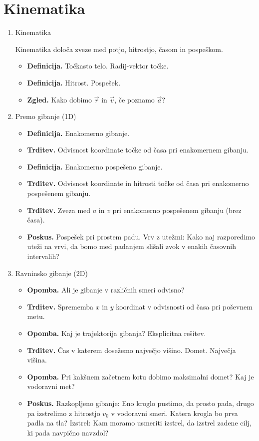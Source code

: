 \section{Kinematika}

\begin{enumerate}
    \item Kinematika
    
    Kinematika določa zveze med potjo, hitrostjo, časom in pospeškom.
    \begin{itemize}
        \item \textbf{Definicija.} Točkasto telo. Radij-vektor točke.
        \item \textbf{Definicija.} Hitrost. Pospešek.
        \item \textbf{Zgled.} Kako dobimo \(\vec{r}\) in \(\vec{v}\), če poznamo \(\vec{a}\)?
    \end{itemize}

    \item Premo gibanje (1D)
    \begin{itemize}
        \item \textbf{Definicija.} Enakomerno gibanje.
        \item \textbf{Trditev.} Odvisnost koordinate točke od časa pri enakomernem gibanju.
        \item \textbf{Definicija.} Enakomerno pospešeno gibanje.
        \item \textbf{Trditev.} Odvisnost koordinate in hitrosti točke od časa pri enakomerno pospešenem gibanju.
        \item \textbf{Trditev.} Zveza med \(a\) in \(v\) pri enakomerno pospešenem gibanju (brez časa).
        \item \textbf{Poskus.} Pospešek pri prostem padu. Vrv z utežmi: Kako naj razporedimo uteži na vrvi, da bomo med padanjem slišali zvok v enakih časovnih intervalih?
    \end{itemize}

    \item Ravninsko gibanje (2D)
    \begin{itemize}
        \item \textbf{Opomba.} Ali je gibanje v različnih smeri odvisno? 
        \item \textbf{Trditev.} Sprememba \(x\) in \(y\) koordinat v odvisnosti od časa pri poševnem metu.
        \item \textbf{Opomba.} Kaj je trajektorija gibanja? Eksplicitna rešitev.
        \item \textbf{Trditev.} Čas v katerem dosežemo največjo višino. Domet. Največja višina.
        \item \textbf{Opomba.} Pri kakšnem začetnem kotu dobimo maksimalni domet? Kaj je vodoravni met?
        \item \textbf{Poskus.} Razkopljeno gibanje: Eno kroglo pustimo, da prosto pada, drugo pa izstrelimo z hitrostjo \(v_0\) v vodoravni smeri. Katera krogla bo prva padla na tla? Izstrel: Kam moramo usmeriti izstrel, da izstrel zadene cilj, ki pada navpično navzdol?
    \end{itemize}


\end{enumerate}
